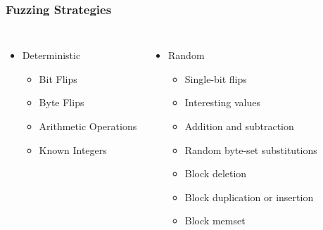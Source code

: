 \begin{frame}
\frametitle{Fuzzing Strategies}
\begin{columns}[t]
\begin{itemize}
\item{Deterministic}
	\begin{itemize}
	\item{Bit Flips}
	\item{Byte Flips}
	\item{Arithmetic Operations}
	\item{Known Integers}	
	\end{itemize}
\end{itemize}
\begin{itemize}
\item{Random}
	\begin{itemize}
	\item{Single-bit flips}
	\item{Interesting values}
	\item{Addition and subtraction}
	\item{Random byte-set substitutions}
	\item{Block deletion}
	\item{Block duplication or insertion}
	\item{Block memset}
	\end{itemize}

\end{itemize}
\end{columns}
\end{frame}
